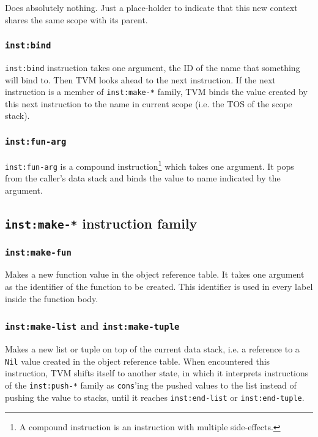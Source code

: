 \documentclass{article}
\newcommand{\inst}[1] {\texttt{inst:#1}}
\begin{document}
Does absolutely nothing. Just a place-holder to indicate that this new context shares the same scope with its parent.

\subsubsection{\inst{bind}}

\inst{bind} instruction takes one argument, the ID of the name that something will bind to. Then TVM looks ahead to the next instruction. If the next instruction is a member of \inst{make-*} family, TVM binds the value created by this next instruction to the name in current scope (i.e. the TOS of the scope stack).

\subsubsection{\inst{fun-arg}}

\inst{fun-arg} is a compound instruction\footnote{A compound instruction is an instruction with multiple side-effects.} which takes one argument. It pops from the caller's data stack and binds the value to name indicated by the argument.

\subsection{\inst{make-*} instruction family}

\subsubsection{\inst{make-fun}}

Makes a new function value in the object reference table. It takes one argument as the identifier of the function to be created. This identifier is used in every label inside the function body.

\subsubsection{\inst{make-list} and \inst{make-tuple}}

Makes a new list or tuple on top of the current data stack, i.e. a reference to a \texttt{Nil} value created in the object reference table. When encountered this instruction, TVM shifts itself to another state, in which it interprets instructions of the \inst{push-*} family as \texttt{cons}'ing the pushed values to the list instead of pushing the value to stacks, until it reaches \inst{end-list} or \inst{end-tuple}.
\end{document}
